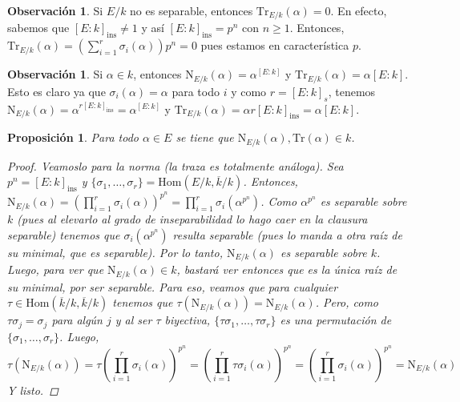 \documentclass[12pt]{book}
\newtheorem{prop}[teo]{Proposición}
\theoremstyle{definition}
\newtheorem{obs}[teo]{Observación}
\renewcommand{\hom}{\mathrm{Hom}}
\begin{document}
\begin{obs}
Si $E/k$ no es separable, entonces $\mathrm{Tr}_{E/k}(\alpha)=0$. En efecto, sabemos que $[E:k]_{\text{ins}}\neq 1$ y así $[E:k]_{\text{ins}}=p^n$ con $n\geq 1$. Entonces, $\mathrm{Tr}_{E/k}(\alpha) = \left(\displaystyle\sum_{i=1}^r \sigma_i(\alpha)\right) p^n = 0$ pues estamos en característica $p$.
\end{obs}

\begin{obs}
Si $\alpha\in k$, entonces $\mathrm{N}_{E/k}(\alpha) = \alpha^{[E:k]}$ y $\mathrm{Tr}_{E/k}(\alpha) = \alpha [E:k]$. Esto es claro ya que $\sigma_i(\alpha) = \alpha$ para todo $i$ y como $r=[E:k]_s$, tenemos $\mathrm{N}_{E/k}(\alpha) = \alpha^{r [E:k]_{\text{ins}}} = \alpha^{[E:k]}$ y $\mathrm{Tr}_{E/k}(\alpha) = \alpha r [E:k]_{\text{ins}} = \alpha [E:k]$.
\end{obs}

\begin{prop}
Para todo $\alpha\in E$ se tiene que $\mathrm{N}_{E/k}(\alpha), \mathrm{Tr}(\alpha)\in k$.
\begin{proof}
Veamoslo para la norma (la traza es totalmente análoga). Sea $p^n = [E:k]_{\text{ins}}$ y $\{\sigma_1,\ldots,\sigma_r\} = \hom(E/k,\overline{k}/k)$. Entonces, $\mathrm{N}_{E/k}(\alpha) = \left(\displaystyle\prod_{i=1}^r \sigma_i(\alpha)\right)^{p^n} = \displaystyle\prod_{i=1}^r \sigma_i(\alpha^{p^n})$. Como $\alpha^{p^n}$ es separable sobre $k$ (pues al elevarlo al grado de inseparabilidad lo hago caer en la clausura separable) tenemos que $\sigma_i(\alpha^{p^n})$ resulta separable (pues lo manda a otra raíz de su minimal, que es separable). Por lo tanto, $\mathrm{N}_{E/k}(\alpha)$ es separable sobre $k$. Luego, para ver que $\mathrm{N}_{E/k}(\alpha)\in k$, bastará ver entonces que es la única raíz de su minimal, por ser separable. Para eso, veamos que para cualquier $\tau\in\hom(\overline{k}/k,\overline{k}/k)$ tenemos que $\tau(\mathrm{N}_{E/k}(\alpha)) = \mathrm{N}_{E/k}(\alpha)$. Pero, como $\tau\sigma_j = \sigma_{j}$ para algún $j$ y al ser $\tau$ biyectiva, $\{\tau\sigma_1,\ldots,\tau\sigma_r\}$ es una permutación de $\{\sigma_1,\ldots, \sigma_r\}$. Luego, $$\tau(\mathrm{N}_{E/k}(\alpha)) = \tau\left(\displaystyle\prod_{i=1}^r \sigma_i(\alpha)\right)^{p^n} = \left(\prod_{i=1}^r \tau\sigma_i(\alpha)\right)^{p^n} = \left(\prod_{i=1}^r \sigma_i(\alpha)\right)^{p^n} = \mathrm{N}_{E/k}(\alpha)$$ Y listo.
\end{proof}
\end{prop}
\end{document}
